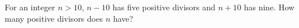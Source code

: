 For an integer $ n>10 $, $ n-10 $ has five positive divisors and $ n+10 $ has nine. How many positive divisors does $ n $ have?
